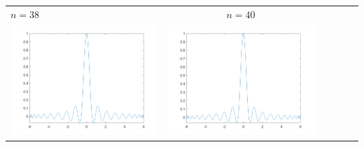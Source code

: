 \begin{tabular}{l*{5}{c}}
\hspace{3.5cm}\(n=38\) &  \(n=40\) \\
\includegraphics[scale=0.5]{cap4/4_7/38.png} &  \includegraphics[scale=0.5]{cap4/4_7/40.png} \\
\end{tabular}

